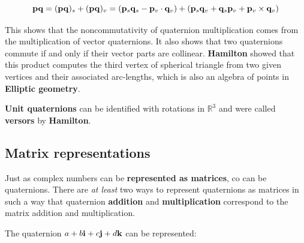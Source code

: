 \begin{equation}
    \mathbf{p} \mathbf{q} = (\mathbf{p} \mathbf{q})_s + (\mathbf{p} \mathbf{q})_v
    = (\mathbf{p}_s \mathbf{q}_s -  \mathbf{p}_v \cdot \mathbf{q}_v )
    + (\mathbf{p}_s \mathbf{q}_v + \mathbf{q}_s \mathbf{p}_v + \mathbf{p}_v \times \mathbf{q}_v)
\end{equation}

This shows that the noncommutativity of quaternion multiplication comes from the
multiplication of vector quaternions. It also shows that two quaternions commute
if and only if their vector parts are collinear. \textbf{Hamilton} showed that
this product computes the third vertex of spherical triangle from two given
vertices and their associated arc-lengths, which is also an algebra of points
in \textbf{Elliptic geometry}.

\textbf{Unit quaternions} can be identified with rotations in $ \mathbb{R}^3 $
and were called \textbf{versors} by \textbf{Hamilton}.


\subsection{Matrix representations}

Just as complex numbers can be \textbf{represented as matrices}, co can be quaternions.
There are \textit{at least} two ways to represent quaternions as matrices in
such a way that quaternion \textbf{addition} and \textbf{multiplication} correspond
to the matrix addition and multiplication.

The quaternion $ a + b \mathbf{i} + c \mathbf{j} + d \mathbf{k} $ can be represented:

